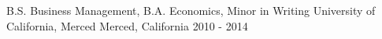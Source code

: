 


\begin{cventriesedu}


\cventry
{B.S. Business Management, B.A. Economics, Minor in Writing} %
{University of California, Merced} %
{Merced, California} %
{2010 - 2014} %
{ %
}


\end{cventriesedu}